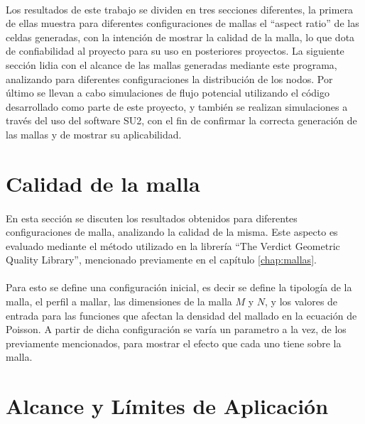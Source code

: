 \documentclass[letterpaper, openright, 12pt]{book}
\begin{document}
    \paragraph*{}
        Los resultados de este trabajo se dividen en tres secciones diferentes,
        la primera de ellas muestra para diferentes configuraciones de mallas
        el ``aspect ratio'' de las celdas generadas, con la intención de mostrar
        la calidad de la malla, lo que dota de confiabilidad al proyecto para su
        uso en posteriores proyectos. La siguiente sección lidia con el alcance
        de las mallas generadas mediante este programa, analizando para
        diferentes configuraciones la distribución de los nodos. Por último se
        llevan a cabo simulaciones de flujo potencial utilizando el código
        desarrollado como parte de este proyecto, y también se realizan
        simulaciones a través del uso del software SU2, con el fin de confirmar
        la correcta generación de las mallas y de mostrar su aplicabilidad.

    \section{Calidad de la malla}
    \paragraph*{}
        En esta sección se discuten los resultados obtenidos para diferentes
        configuraciones de malla, analizando la calidad de la misma. Este
        aspecto es evaluado mediante el método utilizado en la librería ``The
        Verdict Geometric Quality Library'', mencionado previamente en el
        capítulo \ref{chap:mallas}.

    \paragraph*{}
        Para esto se define una configuración inicial, es decir se define la
        tipología de la malla, el perfil a mallar, las dimensiones de la malla
        $M$ y $N$, y los valores de entrada para las funciones que afectan la
        densidad del mallado en la ecuación de Poisson. A partir de dicha
        configuración se varía un parametro a la vez, de los previamente
        mencionados, para mostrar el efecto que cada uno tiene sobre la malla.

    \section{Alcance y Límites de Aplicación}
\end{document}

